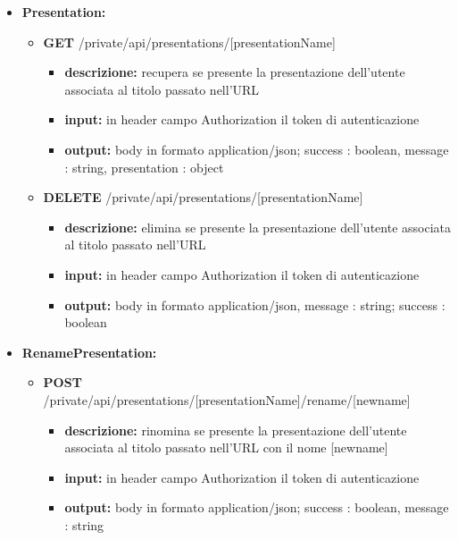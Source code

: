 {{\begin{itemize}
			
		\item \textbf{Presentation:}
			\begin{itemize}
			\item  \textbf{GET} /private/api/presentations/[presentationName]
				\begin{itemize} 
				\item \textbf{descrizione:} recupera se presente la presentazione dell'utente associata al titolo passato nell'URL
				\item \textbf{input:} in header campo Authorization il token di autenticazione
				\item \textbf{output:} body in formato application/json; success : boolean, message : string, presentation : object
				\end{itemize}
				
			\item  \textbf{DELETE} /private/api/presentations/[presentationName]
				\begin{itemize} 
				\item \textbf{descrizione:} elimina se presente la presentazione dell'utente associata al titolo passato nell'URL
				\item \textbf{input:} in header campo Authorization il token di autenticazione
				\item \textbf{output:} body in formato application/json, message : string; success : boolean
				\end{itemize}
			\end{itemize}

		\item \textbf{RenamePresentation:}
			\begin{itemize}
			\item  \textbf{POST} /private/api/presentations/[presentationName]/rename/[newname] 
				\begin{itemize} 
				\item \textbf{descrizione:} rinomina se presente la presentazione dell'utente associata al titolo passato nell'URL con il nome [newname]
				\item \textbf{input:} in header campo Authorization il token di autenticazione
				\item \textbf{output:} body in formato application/json; success : boolean, message : string
				\end{itemize}
			\end{itemize}
			

\end{itemize}}}
